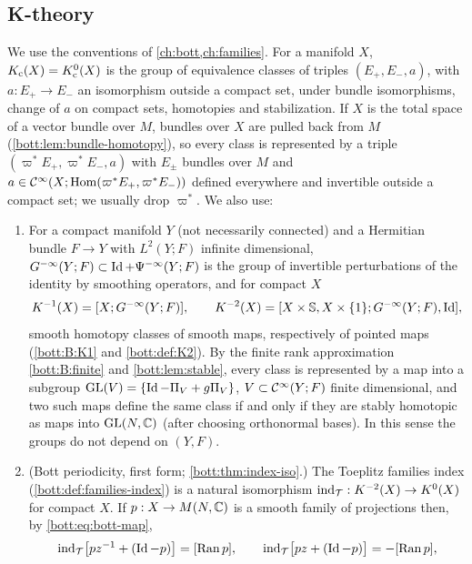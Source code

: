 \subsection{K-theory}
We use the conventions of \cref{ch:bott,ch:families}. For a manifold $X$,
$K_{\mathrm{c}}(X)=K_{\mathrm{c}}^0(X)$ is the group of equivalence classes of triples
$(E_+,E_-,a)$, with $a:E_+\to E_-$ an isomorphism outside a compact set, under
bundle isomorphisms, change of $a$ on compact sets, homotopies and
stabilization. If $X$ is the total space of a vector bundle over $M$, bundles
over $X$ are pulled back from $M$ (\cref{bott:lem:bundle-homotopy}), so every class is
represented by a triple $(\varpi^*E_+,\varpi^*E_-,a)$ with $E_\pm$ bundles over
$M$ and $a\in\mathcal{C}^\infty(X;\operatorname{Hom}(\varpi^*E_+,\varpi^*E_-))$ defined everywhere and
invertible outside a compact set; we usually drop $\varpi^*$. We also use:
\begin{enumerate}[label=(K\arabic*),leftmargin=*]
\item\label{scindex:K-Ginf} For a compact manifold $Y$ (not necessarily
  connected) and a Hermitian bundle $F\to Y$ with $L^2(Y;F)$ infinite dimensional,
  $G^{-\infty}(Y;F)\subset\operatorname{Id}+\Psi^{-\infty}(Y;F)$ is the group of invertible
  perturbations of the identity by smoothing operators, and for compact $X$
  \begin{equation*}
    K^{-1}(X)=[X;G^{-\infty}(Y;F)],\qquad K^{-2}(X)=[X\times\mathbb{S},X\times\{1\};
    G^{-\infty}(Y;F),\operatorname{Id}],
  \end{equation*}
  smooth homotopy classes of smooth maps, respectively of pointed maps
  (\ref{bott:B:K1} and \cref{bott:def:K2}). By the finite rank approximation
  \ref{bott:B:finite} and \cref{bott:lem:stable}, every class is represented by a
  map into a subgroup $\operatorname{GL}(V)=\{\operatorname{Id}-\Pi_V+g\Pi_V\}$, $V\subset\mathcal{C}^\infty(Y;F)$
  finite dimensional, and two such maps define the same class if and only if
  they are stably homotopic as maps into $\operatorname{GL}(N,\mathbb{C})$ (after choosing orthonormal
  bases). In this sense the groups do not depend on $(Y,F)$.
\item\label{scindex:K-toeplitz} (Bott periodicity, first form;
  \cref{bott:thm:index-iso}.) The Toeplitz families index
  (\cref{bott:def:families-index}) is a natural isomorphism
  $\operatorname{ind}_{\mathcal T}:K^{-2}(X)\to K^0(X)$ for compact $X$. If $p:X\to M(N,\mathbb{C})$ is a smooth
  family of projections then, by \eqref{bott:eq:bott-map},
  \begin{equation}\label{scindex:eq:bott-map}
    \operatorname{ind}_{\mathcal T}\bigl[pz^{-1}+(\operatorname{Id}-p)\bigr]=[\operatorname{Ran} p],\qquad
    \operatorname{ind}_{\mathcal T}\bigl[pz+(\operatorname{Id}-p)\bigr]=-[\operatorname{Ran} p],
  \end{equation}

\end{enumerate}
